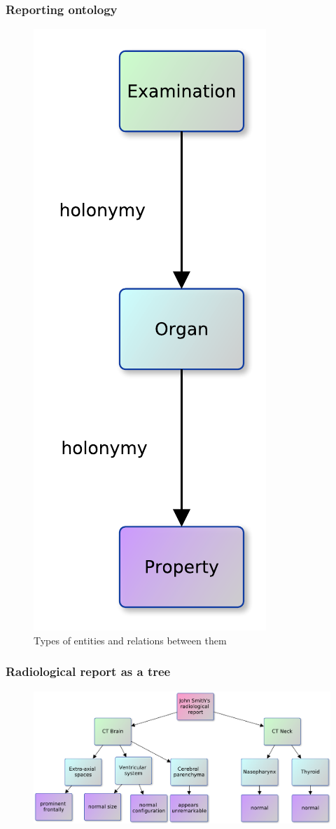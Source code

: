 \documentclass{beamer}
\begin{document}
\begin{frame}
\frametitle{Reporting ontology}
\begin{figure}
	\centering
	\includegraphics[width=0.2\linewidth]{../report-semantic}
	\caption{Types of entities and relations between them}
	\label{fig:report-ontology}
\end{figure}
\end{frame}


\begin{frame}
\frametitle{Radiological report as a tree}
\begin{figure}
\centering
\includegraphics[width=1\linewidth]{../report-tree}
\label{fig:report-tree}
\end{figure}
\end{frame}
\end{document}
